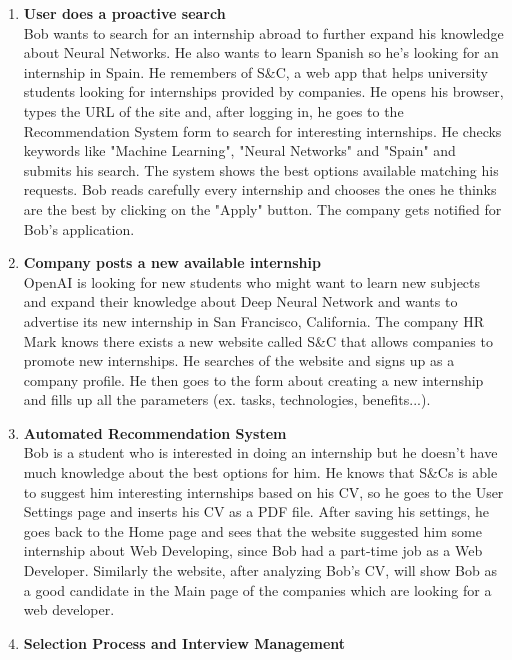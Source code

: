 \documentclass{article}
\begin{document}
\begin{enumerate}
    \item \textbf{User does a proactive search}\\
    Bob wants to search for an internship abroad to further expand his knowledge about Neural Networks. He also wants to learn Spanish so he's looking for an internship in Spain. He remembers of S\&C, a web app that helps university students looking for internships provided by companies. He opens his browser, types the URL of the site and, after logging in, he goes to the Recommendation System form to search for interesting internships. He checks keywords like "Machine Learning", "Neural Networks" and "Spain" and submits his search. The system shows the best options available matching his requests. Bob reads carefully every internship and chooses the ones he thinks are the best by clicking on the "Apply" button. The company gets notified for Bob's application.
    \item \textbf{Company posts a new available internship}\\
    OpenAI is looking for new students who might want to learn new subjects and expand their knowledge about Deep Neural Network and wants to advertise its new internship in San Francisco, California. The company HR Mark knows there exists a new website called S\&C that allows companies to promote new internships. He searches of the website and signs up as a company profile. He then goes to the form about creating a new internship and fills up all the parameters (ex. tasks, technologies, benefits...).
    \item \textbf{Automated Recommendation System}\\
    Bob is a student who is interested in doing an internship but he doesn't have much knowledge about the best options for him. He knows that S\&Cs is able to suggest him interesting internships based on his CV, so he goes to the User Settings page and inserts his CV as a PDF file. After saving his settings, he goes back to the Home page and sees that the website suggested him some internship about Web Developing, since Bob had a part-time job as a Web Developer. Similarly the website, after analyzing Bob's CV, will show Bob as a good candidate in the Main page of the companies which are looking for a web developer.
    \item \textbf{Selection Process and Interview Management}\\

\end{enumerate}
\end{document}
